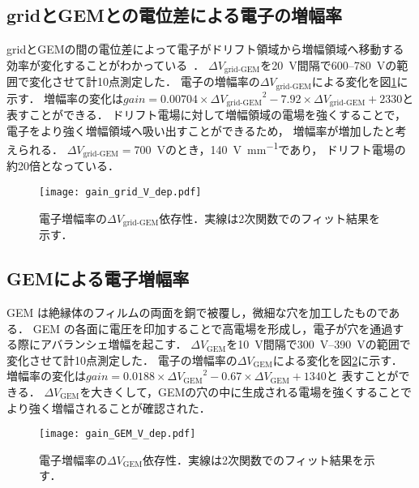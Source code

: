 \documentclass[../master]{subfiles}
\begin{document}
\subsection{gridとGEMとの電位差による電子の増幅率}
gridとGEMの間の電位差によって電子がドリフト領域から増幅領域へ移動する効率が変化することがわかっている~\cite{furuno}．
$\Delta V_{\text{grid-GEM}}$を\SI{20}{\volt}間隔で\SI{600}{}--\SI{780}{\volt}の範囲で変化させて計10点測定した．
電子の増幅率の$\Delta V_{\text{grid-GEM}}$による変化を図\ref{fig::gain_grid_GEM_V_dep}に示す．
増幅率の変化は$\mathit{gain} = 0.00704\times{\Delta V_{\text{grid-GEM}}}^2-7.92\times{\Delta V_{\text{grid-GEM}}}+2330$と
表すことができる．
ドリフト電場に対して増幅領域の電場を強くすることで，電子をより強く増幅領域へ吸い出すことができるため，
増幅率が増加したと考えられる．
$\Delta V_{\text{grid-GEM}} = $\SI{700}{\volt}のとき，\SI{140}{\volt\per\milli\metre}であり，
ドリフト電場の約20倍となっている．
\begin{figure}
  \centering
  \texttt{[image: gain\_grid\_V\_dep.pdf]} 
  \caption{電子増幅率の$\Delta V_{\text{grid-GEM}}$依存性．実線は2次関数でのフィット結果を示す．}
  \label{fig::gain_grid_GEM_V_dep}
\end{figure}

\subsection{GEMによる電子増幅率}
GEM は絶縁体のフィルムの両面を銅で被覆し，微細な穴を加工したものである．
GEM の各面に電圧を印加することで高電場を形成し，電子が穴を通過する際にアバランシェ増幅を起こす．
$\Delta V_{\text{GEM}}$を\SI{10}{\volt}間隔で\SIrange{300}{390}{\volt}の範囲で変化させて計10点測定した．
電子の増幅率の$\Delta V_{\text{GEM}}$による変化を図\ref{fig::gain_GEM_V_dep}に示す．
増幅率の変化は$\mathit{gain} = 0.0188\times{\Delta V_{\text{GEM}}}^2-0.67\times{\Delta V_{\text{GEM}}}+1340$と
表すことができる．
$\Delta V_{\text{GEM}}$を大きくして，GEMの穴の中に生成される電場を強くすることでより強く増幅されることが確認された．
\begin{figure}
  \centering
  \texttt{[image: gain\_GEM\_V\_dep.pdf]}
  \caption{電子増幅率の$\Delta V_{\text{GEM}}$依存性．実線は2次関数でのフィット結果を示す．}
  \label{fig::gain_GEM_V_dep}
\end{figure}
\end{document}
